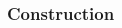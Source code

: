 		\begin{frame}\frametitle{Construction}
		\begin{columns}
			\begin{column}{0.9\textwidth}
				\begin{center}
				\end{center}		
			\end{column}
		\end{columns}
	\end{frame}	

